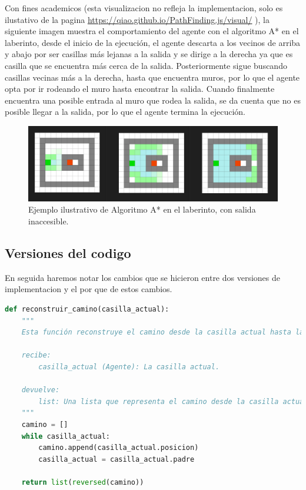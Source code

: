 Con fines academicos (esta visualizacion no refleja la implementacion, solo es ilustativo de la pagina \url{https://qiao.github.io/PathFinding.js/visual/} ), la siguiente imagen muestra el comportamiento del agente con el algoritmo A* en el laberinto, desde el inicio de la ejecución, 
el agente descarta a los vecinos de arriba y abajo por ser casillas más lejanas a la salida y se dirige a la derecha ya que es casilla que se encuentra más cerca de la salida.
Posteriormente sigue buscando casillas vecinas más a la derecha, hasta que encuentra muros, por lo que el agente opta por ir rodeando el muro hasta encontrar la salida.
Cuando finalmente encuentra una posible entrada al muro que rodea la salida, se da cuenta que no es posible llegar a la salida, por lo que el agente termina la ejecución.

\begin{figure}[H]
    \centering
    \includegraphics[width=0.9\linewidth]{IMA/RLaberinto3VCompleto.png} 
    \caption{Ejemplo ilustrativo de Algoritmo A* en el laberinto, con salida inaccesible.} 
    \label{fig:ejemplo} 
\end{figure}

\subsection*{Versiones del codigo}

En seguida haremos notar los cambios que se hicieron entre dos versiones de implementacion y el por que de estos cambios.

\begin{lstlisting}[language=Python, caption=Version 1: reconstruir_camino]
    def reconstruir_camino(casilla_actual):
    """
    Esta función reconstruye el camino desde la casilla actual hasta la posición inicial del agente.

    recibe:
        casilla_actual (Agente): La casilla actual.

    devuelve:
        list: Una lista que representa el camino desde la casilla actual hasta la posición inicial del agente.
    """
    camino = []
    while casilla_actual:
        camino.append(casilla_actual.posicion)
        casilla_actual = casilla_actual.padre

    return list(reversed(camino))
\end{lstlisting}

